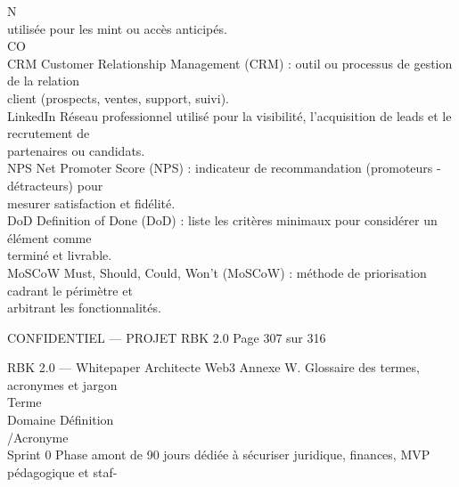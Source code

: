\documentclass[12pt,landscape,a4paper]{article}
\newenvironment{confidential}
{\begin{tcolorbox}[
    colback=rbkred!5!white,
    colframe=rbkred!75!black,
    title=CONFIDENTIEL,
    fonttitle=\bfseries\color{white},
    coltitle=rbkred!75!black,
    breakable,
    enhanced,
    frame hidden,
    borderline west={2pt}{0pt}{rbkred!75!black}
]}
{\end{tcolorbox}}
\begin{document}
\vspace{0.5em}
\vspace{0.5em}
\vspace{0.5em}
N\\
utilisée pour les mint ou accès anticipés.\\
CO\\
CRM                                     Customer Relationship Management (CRM) : outil ou processus de gestion de la relation\\
client (prospects, ventes, support, suivi).\\
\vspace{0.5em}
LinkedIn                                Réseau professionnel utilisé pour la visibilité, l’acquisition de leads et le recrutement de\\
partenaires ou candidats.\\
\vspace{0.5em}
NPS                                     Net Promoter Score (NPS) : indicateur de recommandation (promoteurs - détracteurs) pour\\
mesurer satisfaction et fidélité.\\
\vspace{0.5em}
DoD                                     Definition of Done (DoD) : liste les critères minimaux pour considérer un élément comme\\
terminé et livrable.\\
\vspace{0.5em}
MoSCoW                                  Must, Should, Could, Won’t (MoSCoW) : méthode de priorisation cadrant le périmètre et\\
arbitrant les fonctionnalités.\\
\vspace{0.5em}
\vspace{0.5em}
\vspace{0.5em}
\begin{confidential}CONFIDENTIEL — PROJET RBK 2.0                    Page 307 sur 316\end{confidential}
RBK 2.0 — Whitepaper Architecte Web3                                               Annexe W. Glossaire des termes, acronymes et jargon\\
\vspace{0.5em}
\vspace{0.5em}
Terme\\
Domaine    Définition\\
/Acronyme\\
Sprint 0                                Phase amont de 90 jours dédiée à sécuriser juridique, finances, MVP pédagogique et staf-\\
\end{document}
